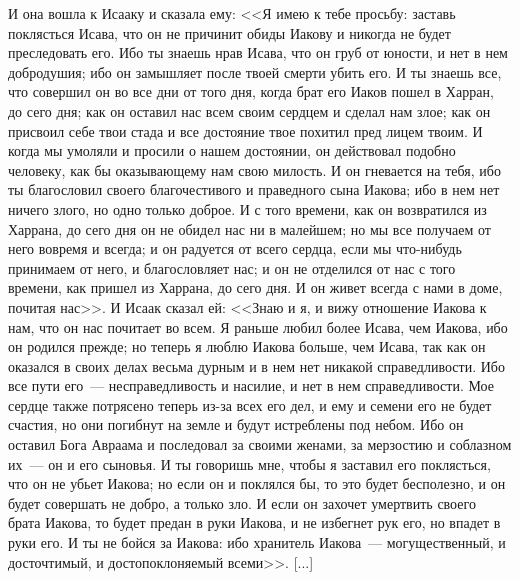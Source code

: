 И она вошла к Исааку и сказала ему: <<Я имею к
тебе просьбу: заставь поклясться Исава, что он не
причинит обиды Иакову и никогда не будет
преследовать его. Ибо ты знаешь нрав Исава, что он
груб от юности, и нет в нем добродушия; ибо он
замышляет после твоей смерти убить его. И ты
знаешь все, что совершил он во все дни от того дня,
когда брат его Иаков пошел в Харран, до сего дня;
как он оставил нас всем своим сердцем и сделал
нам злое; как он присвоил себе твои стада и все
достояние твое похитил пред лицем твоим. И когда
мы умоляли и просили о нашем достоянии, он
действовал подобно человеку, как бы оказывающему
нам свою милость. И он гневается на тебя, ибо ты
благословил своего благочестивого и праведного
сына Иакова; ибо в нем нет ничего злого, но одно
только доброе. И с того времени, как он
возвратился из Харрана, до сего дня он не обидел
нас ни в малейшем; но мы все получаем от него вовремя
и всегда; и он радуется от всего сердца, если мы
что-нибудь принимаем от него, и благословляет
нас; и он не отделился от нас с того времени, как
пришел из Харрана, до сего дня. И он живет всегда с
нами в доме, почитая нас>>. И Исаак сказал ей:
<<Знаю и я, и вижу отношение Иакова к нам, что он
нас почитает во всем. Я раньше любил более Исава,
чем Иакова, ибо он родился прежде; но теперь я
люблю Иакова больше, чем Исава, так как он
оказался в своих делах весьма дурным и в нем нет
никакой справедливости. Ибо все пути его~---
несправедливость и насилие, и нет в нем
справедливости. Мое сердце также потрясено
теперь из-за всех его дел, и ему и семени его не
будет счастия, но они погибнут на земле и будут
истреблены под небом. Ибо он оставил Бога Авраама
и последовал за своими женами, за мерзостию и
соблазном их~--- он и его сыновья. И ты говоришь мне,
чтобы я заставил его поклясться, что он не убьет
Иакова; но если он и поклялся бы, то это будет
бесполезно, и он будет совершать не добро, а
только зло. И если он захочет умертвить своего
брата Иакова, то будет предан в руки Иакова, и не
избегнет рук его, но впадет в руки его. И ты не
бойся за Иакова: ибо хранитель Иакова~---
могущественный, и досточтимый, и
достопоклоняемый всеми>>. [...]

